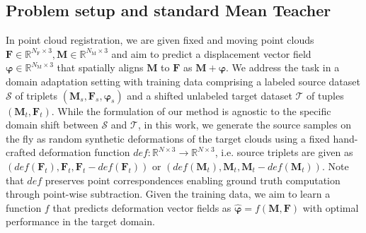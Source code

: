 \documentclass[runningheads]{llncs}
\begin{document}
\subsection{Problem setup and standard Mean Teacher}
In point cloud registration, we are given fixed and moving point clouds $\boldsymbol{F}\in\mathbb{R}^{N_{\mathrm{F}}\times 3},\boldsymbol{M}\in\mathbb{R}^{N_{\mathrm{M}}\times 3}$ and aim to predict a displacement vector field $\boldsymbol{\varphi}\in\mathbb{R}^{N_{\mathrm{M}}\times 3}$ that spatially aligns $\boldsymbol{M}$ to $\boldsymbol{F}$ as $\boldsymbol{M}+\boldsymbol{\varphi}$.
We address the task in a domain adaptation setting with training data comprising a labeled source dataset $\mathcal{S}$ of triplets $(\boldsymbol{M}_s,\boldsymbol{F}_s,\boldsymbol{\varphi}_s)$ and a shifted unlabeled target dataset $\mathcal{T}$ of tuples $(\boldsymbol{M}_t,\boldsymbol{F}_t)$.
While the formulation of our method is agnostic to the specific domain shift between $\mathcal{S}$ and $\mathcal{T}$, in this work, we generate the source samples on the fly as random synthetic deformations of the target clouds using a fixed hand-crafted deformation function $def:\mathbb{R}^{N\times 3}\rightarrow\mathbb{R}^{N\times 3}$, i.e. source triplets are given as $(def(\boldsymbol{F}_t),\boldsymbol{F}_t,\boldsymbol{F}_t-def(\boldsymbol{F}_t))$ or $(def(\boldsymbol{M}_t),\boldsymbol{M}_t,\boldsymbol{M}_t-def(\boldsymbol{M}_t))$.
Note that $def$ preserves point correspondences enabling ground truth computation through point-wise subtraction.
Given the training data, we aim to learn a function $f$ that predicts deformation vector fields as $\hat{\boldsymbol{\varphi}}=f(\boldsymbol{M},\boldsymbol{F})$ with optimal performance in the target domain.
\end{document}
